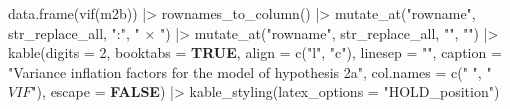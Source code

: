 \documentclass[
  bookmarksnumbered]{article}
\newenvironment{Shaded}{\begin{snugshade}}{\end{snugshade}}
\newcommand{\AttributeTok}[1]{\textcolor[rgb]{0.80,0.80,0.80}{#1}}
\newcommand{\ConstantTok}[1]{\textcolor[rgb]{0.86,0.64,0.64}{\textbf{#1}}}
\newcommand{\DecValTok}[1]{\textcolor[rgb]{0.86,0.86,0.80}{#1}}
\newcommand{\FunctionTok}[1]{\textcolor[rgb]{0.94,0.94,0.56}{#1}}
\newcommand{\NormalTok}[1]{\textcolor[rgb]{0.80,0.80,0.80}{#1}}
\newcommand{\SpecialCharTok}[1]{\textcolor[rgb]{0.86,0.64,0.64}{#1}}
\newcommand{\StringTok}[1]{\textcolor[rgb]{0.80,0.58,0.58}{#1}}
\begin{document}
\begin{Shaded}
\begin{Highlighting}[]
\FunctionTok{data.frame}\NormalTok{(}\FunctionTok{vif}\NormalTok{(m2b)) }\SpecialCharTok{|\textgreater{}} 
  \FunctionTok{rownames\_to\_column}\NormalTok{() }\SpecialCharTok{|\textgreater{}} 
  \FunctionTok{mutate\_at}\NormalTok{(}\StringTok{"rowname"}\NormalTok{, str\_replace\_all, }\StringTok{":"}\NormalTok{, }\StringTok{" × "}\NormalTok{) }\SpecialCharTok{|\textgreater{}}
  \FunctionTok{mutate\_at}\NormalTok{(}\StringTok{"rowname"}\NormalTok{, str\_replace\_all, }\StringTok{"\textasciigrave{}"}\NormalTok{, }\StringTok{""}\NormalTok{) }\SpecialCharTok{|\textgreater{}} 
  \FunctionTok{kable}\NormalTok{(}\AttributeTok{digits =} \DecValTok{2}\NormalTok{,}
        \AttributeTok{booktabs =} \ConstantTok{TRUE}\NormalTok{,}
        \AttributeTok{align =} \FunctionTok{c}\NormalTok{(}\StringTok{"l"}\NormalTok{, }\StringTok{"c"}\NormalTok{),}
        \AttributeTok{linesep =} \StringTok{""}\NormalTok{,}
        \AttributeTok{caption =} \StringTok{"Variance inflation factors for the model of hypothesis 2a"}\NormalTok{,}
        \AttributeTok{col.names =} \FunctionTok{c}\NormalTok{(}\StringTok{" "}\NormalTok{,}
                      \StringTok{"$VIF$"}\NormalTok{),}
        \AttributeTok{escape =} \ConstantTok{FALSE}\NormalTok{) }\SpecialCharTok{|\textgreater{}}
  \FunctionTok{kable\_styling}\NormalTok{(}\AttributeTok{latex\_options =} \StringTok{"HOLD\_position"}\NormalTok{)}
\end{Highlighting}
\end{Shaded}
\end{document}
